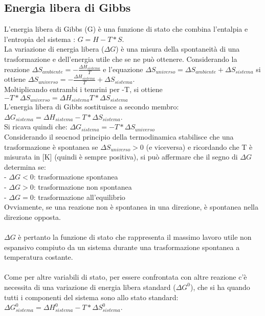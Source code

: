 \subsection{Energia libera di Gibbs}
L'energia libera di Gibbs (G) è una funzione di stato che combina l'entalpia e l'entropia del sistema : $G = H- T* S$.\\
La variazione di energia libera ($\Delta G$) è una misura della spontaneità di una trasformazione e dell'energia utile che se ne può ottenere. Considerando la reazione $\Delta S_{ambiente} = -\frac{\Delta H_{sistema}}{T}$ e l'equazione $\Delta S_{universo} = \Delta S_{ambiente} + \Delta S_{sistema}$ si ottiene $\Delta S_{universo} = -\frac{\Delta H_{sistema}}{T} + \Delta S_{sistema}$.\\
Moltiplicando entrambi i temrini per -T, si ottiene $-T * \Delta S_{universo} = \Delta H_{sistema} T * \Delta S_{sistema}$\\
L'energia libera di Gibbs sostituisce a secondo membro: $\Delta G_{sistema} = \Delta H_{sistema} - T * \Delta S_{sistema}$.\\
Si ricava quindi che: $\Delta G_{sistema} = -T * \Delta S_{universo}$\\
Considerando il seocnod principio della termodinamica stabilisce che una trasformazione è spontanea se $\Delta S_{universo} > 0$ (e viceversa) e ricordando che T è misurata in [K] (quindi è sempre positiva), si può affermare che il segno di $\Delta G$ determina se:\\
\tab- $\Delta G < 0$: trasformazione spontanea\\
\tab- $\Delta G > 0$: trasformazione non spontanea\\
\tab- $\Delta G = 0$: trasformazione all'equilibrio\\
Ovviamente, se una reazione non è spontanea in una direzione, è spontanea nella direzione opposta.\\\\
$\Delta G$ è pertanto la funzione di stato che rappresenta il massimo lavoro utile non espansivo compiuto da un sistema durante una trasformazione spontanea a temperatura costante.\\\\
Come per altre variabili di stato, per essere confrontata con altre reazione c'è necessita di una variazione di energia libera standard ($\Delta G^0$), che si ha quando tutti i componenti del sistema sono allo stato standard: $\Delta G_{sistema}^0 = \Delta H_{sistema}^0 - T * \Delta S_{sistema}^0$.\\

